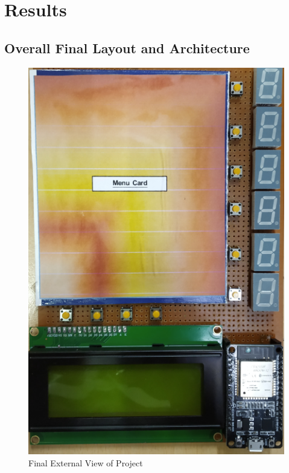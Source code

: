 \documentclass[12pt,a4paper]{article}
\begin{document}
		\newpage
	    \section{Results}
	    \subsection{Overall Final Layout and Architecture}
	    \begin{figure}[h]
	    	\centering
	    	\caption{Final External View of Project}
	    	\includegraphics[scale=.75]{overall_layout}
	    \end{figure}
    \newpage
\end{document}
